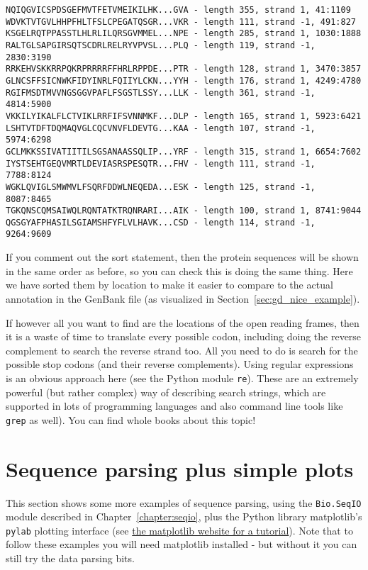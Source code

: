 \begin{verbatim}
NQIQGVICSPDSGEFMVTFETVMEIKILHK...GVA - length 355, strand 1, 41:1109
WDVKTVTGVLHHPFHLTFSLCPEGATQSGR...VKR - length 111, strand -1, 491:827
KSGELRQTPPASSTLHLRLILQRSGVMMEL...NPE - length 285, strand 1, 1030:1888
RALTGLSAPGIRSQTSCDRLRELRYVPVSL...PLQ - length 119, strand -1, 2830:3190
RRKEHVSKKRRPQKRPRRRRFFHRLRPPDE...PTR - length 128, strand 1, 3470:3857
GLNCSFFSICNWKFIDYINRLFQIIYLCKN...YYH - length 176, strand 1, 4249:4780
RGIFMSDTMVVNGSGGVPAFLFSGSTLSSY...LLK - length 361, strand -1, 4814:5900
VKKILYIKALFLCTVIKLRRFIFSVNNMKF...DLP - length 165, strand 1, 5923:6421
LSHTVTDFTDQMAQVGLCQCVNVFLDEVTG...KAA - length 107, strand -1, 5974:6298
GCLMKKSSIVATIITILSGSANAASSQLIP...YRF - length 315, strand 1, 6654:7602
IYSTSEHTGEQVMRTLDEVIASRSPESQTR...FHV - length 111, strand -1, 7788:8124
WGKLQVIGLSMWMVLFSQRFDDWLNEQEDA...ESK - length 125, strand -1, 8087:8465
TGKQNSCQMSAIWQLRQNTATKTRQNRARI...AIK - length 100, strand 1, 8741:9044
QGSGYAFPHASILSGIAMSHFYFLVLHAVK...CSD - length 114, strand -1, 9264:9609
\end{verbatim}

If you comment out the sort statement, then the protein sequences will be
shown in the same order as before, so you can check this is doing the same
thing.  Here we have sorted them by location to make it easier to compare
to the actual annotation in the GenBank file (as visualized in
Section~\ref{sec:gd_nice_example}).

If however all you want to find are the locations of the open reading frames,
then it is a waste of time to translate every possible codon, including doing
the reverse complement to search the reverse strand too.  All you need to do
is search for the possible stop codons (and their reverse complements).  Using
regular expressions is an obvious approach here (see the Python module
\verb|re|). These are an extremely powerful (but rather complex) way of
describing search strings, which are supported in lots of programming
languages and also command line tools like \texttt{grep} as well). You can
find whole books about this topic!


\section{Sequence parsing plus simple plots}
\label{sec:sequence-parsing-plus-pylab}

This section shows some more examples of sequence parsing, using the
\verb|Bio.SeqIO| module described in Chapter~\ref{chapter:seqio},
plus the Python library matplotlib's \verb|pylab| plotting interface
(see \href{https://matplotlib.org}{the matplotlib website
for a tutorial}).  Note that to follow these examples you will need
matplotlib installed - but without it you can still try the data
parsing bits.

